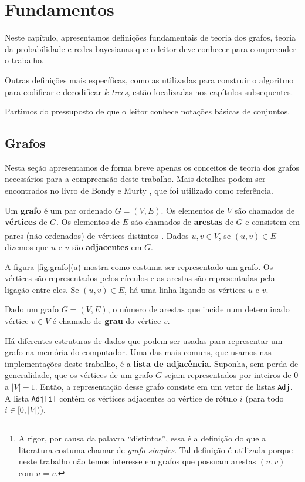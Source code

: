 \chapter{Fundamentos}
\label{cap:fundamentos}

Neste capítulo, apresentamos definições fundamentais de teoria dos grafos, teoria da probabilidade e redes bayesianas que o leitor deve conhecer para compreender o trabalho.

Outras definições mais específicas, como as utilizadas para construir o algoritmo para codificar e decodificar \emph{$k$-trees}, estão localizadas nos capítulos subsequentes.

Partimos do pressuposto de que o leitor conhece notações básicas de conjuntos.

\section{Grafos}

Nesta seção apresentamos de forma breve apenas os conceitos de teoria dos grafos necessários para a compreensão deste trabalho. Mais detalhes podem ser encontrados no livro de Bondy e Murty \cite{bondy}, que foi utilizado como referência.

\begin{definition}[grafo]
  Um \textbf{grafo} é um par ordenado $G = (V, E)$. Os elementos de $V$ são chamados de \textbf{vértices} de $G$. Os elementos de $E$ são chamados de \textbf{arestas} de $G$ e consistem em pares (não-ordenados) de vértices distintos\footnote{A rigor, por causa da palavra ``distintos'', essa é a definição do que a literatura costuma chamar de \emph{grafo simples}. Tal definição é utilizada porque neste trabalho não temos interesse em grafos que possuam arestas $(u, v)$ com $u=v$.}. Dados $u, v \in V$, se $(u, v) \in E$ dizemos que $u$ e $v$ são \textbf{adjacentes} em $G$.

  A figura \ref{fig:grafo}(a) mostra como costuma ser representado um grafo. Os vértices são representados pelos círculos e as arestas são representadas pela ligação entre eles. Se $(u, v) \in E$, há uma linha ligando os vértices $u$ e $v$.

  Dado um grafo $G = (V, E)$, o número de arestas que incide num determinado vértice $v \in V$ é chamado de \textbf{grau} do vértice $v$.
\end{definition}

Há diferentes estruturas de dados que podem ser usadas para representar um grafo na memória do computador. Uma das mais comuns, que usamos nas implementações deste trabalho, é a \textbf{lista de adjacência}. Suponha, sem perda de generalidade, que os vértices de um grafo $G$ sejam representados por inteiros de $0$ a $|V|-1$. Então, a representação desse grafo consiste em um vetor de listas {\tt Adj}. A lista {\tt Adj[i]} contém os vértices adjacentes ao vértice de rótulo $i$ (para todo $i \in [0, |V|)$).

